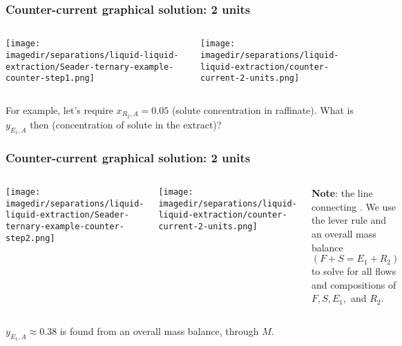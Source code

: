 \begin{frame}\frametitle{Counter-current graphical solution: 2 units}
	\begin{columns}[t]
			\begin{center}
				\texttt{[image: \\imagedir/separations/liquid-liquid-extraction/Seader-ternary-example-counter-step1.png]}
			\end{center}
			\begin{center}
				\texttt{[image: \\imagedir/separations/liquid-liquid-extraction/counter-current-2-units.png]}
			\end{center}
	\end{columns}
	\vspace{12pt}
	For example, let's require $x_{R_2,A} = 0.05$ {\scriptsize (solute concentration in raffinate)}. What is $y_{E_1,A}$ then {\scriptsize (concentration of solute in the extract)}?	
	\vfill
\end{frame}

\begin{frame}\frametitle{Counter-current graphical solution: 2 units}
	\begin{columns}[t]
			\begin{center}
				\texttt{[image: \\imagedir/separations/liquid-liquid-extraction/Seader-ternary-example-counter-step2.png]}
			\end{center}
			\begin{center}
				\texttt{[image: \\imagedir/separations/liquid-liquid-extraction/counter-current-2-units.png]}
			\end{center}
			\textbf{Note}: the line connecting {}. We use the lever rule and an overall mass balance $(F + S = E_1 + R_2)$ to solve for all flows and compositions of $F, S, E_1,$ and $R_2$.
	\end{columns}
	\vspace{12pt}
	$y_{E_1,A}\approx 0.38$ is found from an overall mass balance, through $M$.
	\vfill
\end{frame}

